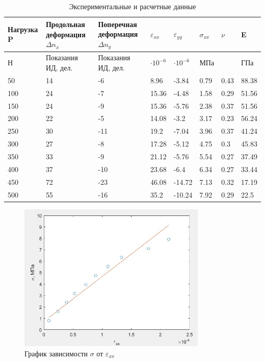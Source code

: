 \documentclass[12pt, a4paper]{article}
\begin{document}
\begin{table}[h]
\centering
\begin{tabular}{|m{2cm}|m{2.5cm}|m{2.5cm}|m{1.5cm}|m{1.5cm}|m{1.5cm}|m{1.5cm}|m{1.5cm}|}
\hline
Нагрузка P &Продольная  деформация $ \Delta n_{x}$& Поперечная  деформация $\Delta n_{y}$& $\varepsilon_{xx}$ &
$\varepsilon_{yy}$ & $\sigma_{xx}$ & $\nu $& E \\

\hline
Н & Показания ИД, дел. & Показания ИД, дел. & $\cdot 10^{-6} $ & $\cdot 10^{-6} $ &МПа& &ГПа \\
\hline
50&14&-6&8.96&-3.84&0.79&0.43&88.38\\

100&24&-7&15.36&-4.48&1.58&0.29&51.56\\

150&24&-9&15.36&-5.76&2.38&0.37&51.56\\

200&22&-5&14.08&-3.2&3.17&0.23&56.24\\

250&30&-11&19.2&-7.04&3.96&0.37&41.24\\

300 & 27 & -8 & 17.28 & -5.12 & 4.75 & 0.3 & 45.83\\

350&33&-9&21.12&-5.76&5.54&0.27&37.49\\

400&37&-10&23.68&-6.4&6.34&0.27&33.44\\

450&72&-23&46.08&-14.72&7.13&0.32&17.19\\

500 & 55 & -16 & 35.2 &-10.24 &7.92 & 0.29 & 22.5\\
\hline


\end{tabular}
\caption{Экспериментальные и расчетные данные}
\label{tb1}
 \end{table}
 \begin{figure}[h]
        \centering
        \includegraphics[width = 9cm]{Lab2_4.jpg}
        \caption{График зависимости $\sigma$ от $\varepsilon_{xx}$}
        \label{im2}
    \end{figure}
\end{document}
